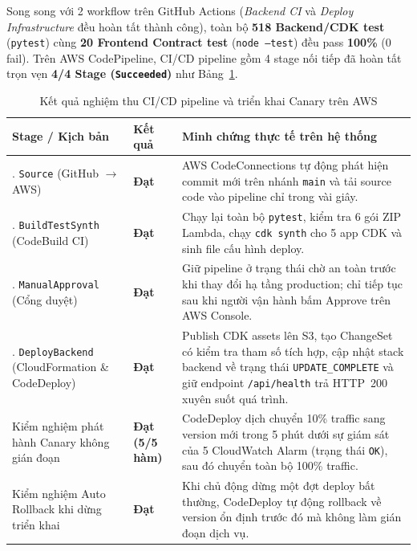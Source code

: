 \documentclass[a4paper,12pt]{article}
\newcommand{\code}[1]{\texttt{#1}}
\begin{document}
Song song với 2 workflow trên GitHub Actions (\textit{Backend CI} và \textit{Deploy Infrastructure} đều hoàn tất thành công), toàn bộ \textbf{518 Backend/CDK test} (\code{pytest}) cùng \textbf{20 Frontend Contract test} (\code{node --test}) đều pass \textbf{100\%} (0 fail). Trên AWS CodePipeline, CI/CD pipeline gồm 4 stage nối tiếp đã hoàn tất trọn vẹn \textbf{4/4 Stage (\code{Succeeded})} như Bảng~\ref{tab:cicd_pipeline_acceptance}.

\begingroup
\setlength{\tabcolsep}{6pt}
\renewcommand{\arraystretch}{1.18}
\fontsize{10.5}{14}\selectfont
\begin{longtable}{@{}>{\raggedright\arraybackslash}p{4.3cm}>{\raggedright\arraybackslash}p{2.3cm}>{\raggedright\arraybackslash}p{\dimexpr\linewidth-6.6cm-4\tabcolsep\relax}@{}}
\caption{Kết quả nghiệm thu CI/CD pipeline và triển khai Canary trên AWS}\label{tab:cicd_pipeline_acceptance}\\
\toprule
\textbf{Stage / Kịch bản} & \textbf{Kết quả} & \textbf{Minh chứng thực tế trên hệ thống}\\
\midrule
\endfirsthead
\endhead
\endfoot
\bottomrule
\endlastfoot
1. \code{Source} (GitHub $\rightarrow$ AWS) & \textbf{Đạt} & AWS CodeConnections tự động phát hiện commit mới trên nhánh \code{main} và tải source code vào pipeline chỉ trong vài giây.\\
2. \code{BuildTestSynth} (CodeBuild CI) & \textbf{Đạt} & Chạy lại toàn bộ \code{pytest}, kiểm tra 6 gói ZIP Lambda, chạy \code{cdk synth} cho 5 app CDK và sinh file cấu hình deploy.\\
3. \code{ManualApproval} (Cổng duyệt) & \textbf{Đạt} & Giữ pipeline ở trạng thái chờ an toàn trước khi thay đổi hạ tầng production; chỉ tiếp tục sau khi người vận hành bấm Approve trên AWS Console.\\
4. \code{DeployBackend} (CloudFormation \& CodeDeploy) & \textbf{Đạt} & Publish CDK assets lên S3, tạo ChangeSet có kiểm tra tham số tích hợp, cập nhật stack backend về trạng thái \code{UPDATE\_COMPLETE} và giữ endpoint \code{/api/health} trả HTTP~200 xuyên suốt quá trình.\\
Kiểm nghiệm phát hành Canary không gián đoạn & \textbf{Đạt (5/5 hàm)} & CodeDeploy dịch chuyển 10\% traffic sang version mới trong 5 phút dưới sự giám sát của 5 CloudWatch Alarm (trạng thái \code{OK}), sau đó chuyển toàn bộ 100\% traffic.\\
Kiểm nghiệm Auto Rollback khi dừng triển khai & \textbf{Đạt} & Khi chủ động dừng một đợt deploy bất thường, CodeDeploy tự động rollback về version ổn định trước đó mà không làm gián đoạn dịch vụ.\\
\end{longtable}
\endgroup
\end{document}
